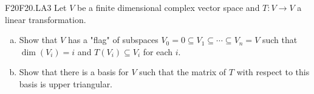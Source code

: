 \documentclass{article}
\newcommand{\sq}{\subseteq}
\theoremstyle{definition}
\begin{document}
	\begin{prob}{F20}{F20.LA3}
	Let $V$ be a finite dimensional complex vector space and $T: V \to V$ a linear transformation.
	\begin{enumerate}[(a)]
	\item Show that $V$ has a "flag" of subspaces $V_0 = 0 \sq V_1 \sq \cdots \sq V_n = V$ such that $\dim(V_i) = i$ and $T(V_i) \sq V_i$ for each $i$.
	\item Show that there is a basis for $V$ such that the matrix of $T$ with respect to this basis is upper triangular.
	\end{enumerate}
	\end{prob}
	
\end{document}

